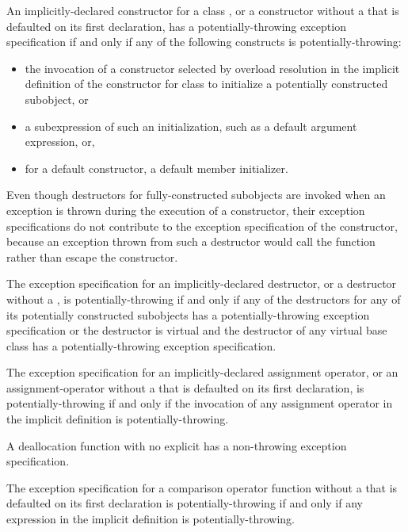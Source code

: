 \pnum
An implicitly-declared constructor for a class ,
or a constructor without a 
that is defaulted on its first declaration,
has a potentially-throwing exception specification
if and only if
any of the following constructs is potentially-throwing:
\begin{itemize}
\item
the invocation of a constructor selected by overload resolution
in the implicit definition of the constructor
for class 
to initialize a potentially constructed subobject, or
\item
a subexpression of such an initialization,
such as a default argument expression, or,
\item
for a default constructor, a default member initializer.
\end{itemize}
\begin{note}
Even though destructors for fully-constructed subobjects
are invoked when an exception is thrown
during the execution of a constructor,
their exception specifications do not contribute
to the exception specification of the constructor,
because an exception thrown from such a destructor
would call the function 
rather than escape the constructor.
\end{note}

\pnum
The exception specification for an implicitly-declared destructor,
or a destructor without a ,
is potentially-throwing if and only if
any of the destructors
for any of its potentially constructed subobjects
has a potentially-throwing exception specification or
the destructor is virtual and the destructor of any virtual base class
has a potentially-throwing exception specification.

\pnum
The exception specification for an implicitly-declared assignment operator,
or an assignment-operator without a 
that is defaulted on its first declaration,
is potentially-throwing if and only if
the invocation of any assignment operator
in the implicit definition is potentially-throwing.

\pnum
A deallocation function
with no explicit 
has a non-throwing exception specification.

\pnum
The exception specification for a comparison operator function
without a 
that is defaulted on its first declaration
is potentially-throwing if and only if
any expression
in the implicit definition is potentially-throwing.

